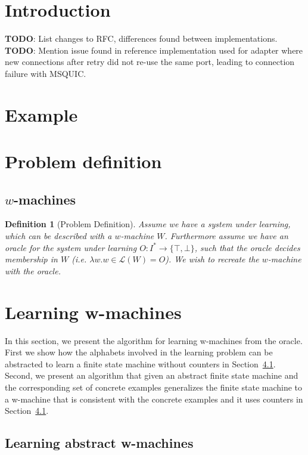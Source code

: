 \documentclass{article}
\newtheorem{definition}{Definition}
\begin{document}
\section{Introduction}
\textbf{TODO}: List changes to RFC, differences found between implementations.
\textbf{TODO}: Mention issue found in reference implementation used for adapter where new connections after retry did not re-use the same port, leading to connection failure with MSQUIC.

\section{Example}



\section{Problem definition}


\subsection{$w$-machines}


\begin{definition}[Problem Definition]
Assume we have a system under learning, which can be described with a $w$-machine $W$. Furthermore assume we have an oracle for the system under learning $O : I^* \to \{\top, \bot\}$, such that the oracle decides membership in $W$ (i.e. $\lambda w. w \in \mathcal{L}(W) = O$). We wish to recreate the $w$-machine with the oracle.
\end{definition}

\section{Learning w-machines}

In this section, we present the algorithm for learning w-machines from the oracle.
First we show how the alphabets involved in the learning problem can be abstracted to learn a finite state machine
without counters in Section~\ref{}. Second, we present an algorithm that given an abstract finite state machine
and the corresponding set of concrete examples generalizes the finite state machine to a w-machine that is consistent
with the concrete examples and it uses counters in Section~\ref{}.

\subsection{Learning abstract w-machines}
\end{document}
